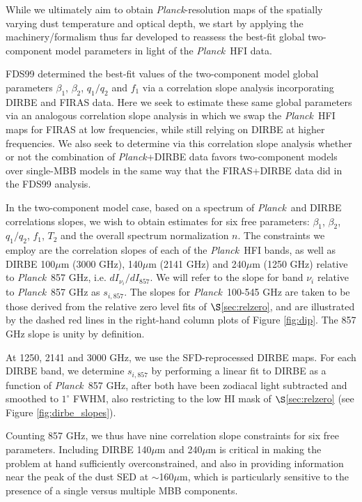 \documentclass{emulateapj}
\newcommand{\PLANCK}{{\it Planck}}
\begin{document}
While we ultimately aim to obtain \PLANCK-resolution maps of the spatially 
varying dust temperature and optical depth, we start by applying the 
machinery/formalism thus far developed to reassess the best-fit global 
two-component model parameters in light of the \PLANCK~HFI data.

FDS99 determined the best-fit values of the two-component model global 
parameters $\beta_1$, $\beta_2$, $q_1/q_2$ and $f_1$ via a correlation slope
analysis incorporating DIRBE and FIRAS data. Here we seek to estimate these 
same global parameters via an analogous correlation slope analysis in which we 
swap the \PLANCK~HFI maps for FIRAS at low frequencies, while still relying on 
DIRBE at higher frequencies. We also seek to determine via this correlation 
slope analysis whether or not the combination of \PLANCK+DIRBE data favors 
two-component models over single-MBB models in the same way that the 
FIRAS+DIRBE data did in the FDS99 analysis.

In the two-component model case, based on a spectrum of \PLANCK~and 
DIRBE correlations slopes, we wish to obtain estimates for six free parameters:
$\beta_1$, $\beta_2$, $q_1/q_2$, $f_1$, $T_2$ and the overall spectrum 
normalization $n$. The constraints we employ are the correlation slopes of each
of the \PLANCK~HFI bands, as well as DIRBE 100$\mu$m (3000 GHz), 140$\mu$m 
(2141 GHz) and 240$\mu$m (1250 GHz) relative to \PLANCK~857 GHz, i.e. 
$dI_{\nu_i}/dI_{857}$. We will refer to the slope for band $\nu_i$ relative to 
\PLANCK~857 GHz as $s_{i,857}$. The slopes for \PLANCK~100-545 GHz are taken 
to be those derived from the relative zero level fits of $\S$\ref{sec:relzero},
and are illustrated by the dashed red lines in the right-hand column plots of 
Figure \ref{fig:dip}. The 857 GHz slope is unity by definition.

At 1250, 2141 and 3000 GHz, we use the SFD-reprocessed DIRBE maps. For each
DIRBE band, we determine $s_{i, 857}$ by performing a linear fit to DIRBE as a 
function of \PLANCK~857 GHz, after both have been zodiacal light subtracted and
smoothed to $1^{\circ}$ FWHM, also restricting to the low HI mask of 
$\S$\ref{sec:relzero} (see Figure \ref{fig:dirbe_slopes}).

Counting 857 GHz, we thus have nine correlation slope constraints for six 
free parameters. Including DIRBE 140$\mu$m and 240$\mu$m is critical in making 
the problem at hand sufficiently overconstrained, and also in providing 
information near the peak of the dust SED at $\sim$160$\mu$m, which is 
particularly sensitive to the presence of a single versus multiple MBB 
components. 
\end{document}
